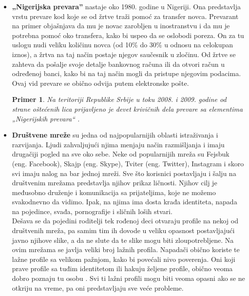 \documentclass[a4paper]{article}
\newtheorem{primer}{Primer}[section]
\begin{document}
\begin{itemize}
\item \textbf{„Nigerijska prevara”} nastaje oko 1980. godine u Nigeriji. Ona predstavlja vrstu prevare kod koje se od žrtve traži pomoć za transfer novca. Prevarant na primer objašnjava da mu je novac zarobljen u inostranstvu i da mu je potrebna pomoć oko transfera, kako bi uspeo da se oslobodi poreza. On za tu uslogu nudi veliku količinu novca (od 10\% do 30\% u odnosu na celokupan iznos), a žrtva na taj način postaje njegov saučesnik u zločinu. Od žrtve se zahteva da pošalje svoje detalje bankovnog računa ili da otvori račun u određenoj banci, kako bi na taj način mogli da pristupe njegovim podacima. Ovaj vid prevare se obično odvija putem elektronske pošte. 
\begin{primer}
Na teritoriji Republike Srbije u toku 2008. i 2009. godine od strane oštećenih lica prijavljeno je devet krivičnih dela prevare sa elementima „Nigerijskih prevara“ \cite{nig}.
\end{primer}

\end{itemize}
\begin{itemize}
\item\textbf{Društvene mreže} su jedna od najpopularnijih oblasti istraživanja i razvijanja. Ljudi zahvaljujući njima menjaju način razmišljanja i imaju drugačiji pogled na sve oko sebe. Neke od popularnijih mreža su Fejsbuk (eng. Facebook), Skajp (eng. Skype), Tviter (eng. Twitter), Instagram i skoro svi imaju nalog na bar jednoj mreži. Sve što korisnici postavljaju i šalju na društvenim mrežama predstavlja njihov prikaz ličnosti. Njihov cilj je međusobno druženje i komunikacija sa prijateljima, koje ne možemo svakodnevno da vidimo. Ipak, na njima ima dosta krađa identiteta, napada na pojedince, svađa, pornografije i sličnih loših stvari.\\Dešava se da pojedini roditelji tek rođenoj deci otvaraju profile na nekoj od društvenih mreža, pa samim tim ih dovode u veliku opasnost postavljajući javno njihove slike, a da ne slute da te slike mogu biti zloupotrebljene. Na ovim mrežama se javlja veliki broj lažnih profila.
Napadači obično koriste te lažne profile sa velikom pažnjom, kako bi povećali nivo poverenja. Oni koji prave profile sa tuđim identitetom ili hakuju željene profile, obično veoma dobro poznaju tu osobu \cite{fakePr}. Svi ti lažni profili mogu biti veoma opasni ako se ne otkriju na vreme, pa oni predstavljaju sve veće probleme.
\end{itemize}
\end{document}
